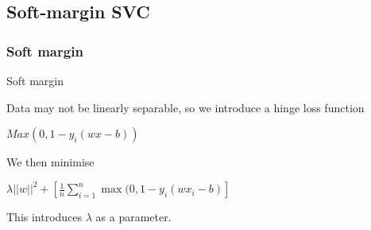 
\subsection{Soft-margin SVC}

\subsubsection{Soft margin}

Soft margin

Data may not be linearly separable, so we introduce a hinge loss function

\(Max(0, 1-y_i(wx-b))\)

We then minimise

\(\lambda ||w||^2+ [\frac{1}{n}\sum_{i=1}^n \max (0, 1-y_i(wx_i-b)]\)

This introduces \(\lambda\) as a parameter.


